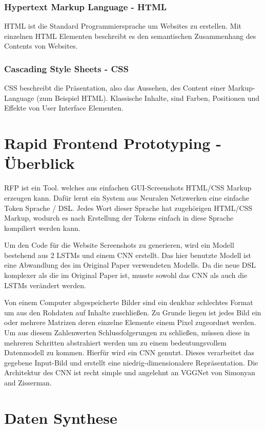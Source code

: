 \documentclass[pdftex,a4paper,halfparskip, article]{scrartcl}
\begin{document}
\subsubsection{Hypertext Markup Language - HTML}
HTML ist die Standard Programmiersprache um Websites zu erstellen. Mit einzelnen HTML Elementen beschreibt es den semantischen Zusammenhang des Contents von Websites.

\subsubsection{Cascading Style Sheets - CSS}
CSS beschreibt die Präsentation, also das Aussehen, des Content einer Markup-Language (zum Beispiel HTML). Klassische Inhalte, sind Farben, Positionen und Effekte von User Interface Elementen.
 

\section{Rapid Frontend Prototyping - Überblick}

RFP ist ein Tool. welches aus einfachen GUI-Screenshots HTML/CSS Markup erzeugen kann. Dafür lernt ein System aus Neuralen Netzwerken eine einfache Token Sprache / DSL. Jedes Wort dieser Sprache hat zugehörigen HTML/CSS Markup, wodurch es nach Erstellung der Tokens einfach in diese Sprache kompiliert werden kann.

Um den Code für die Website Screenshots zu generieren, wird ein Modell bestehend aus 2 LSTMs und einem CNN erstellt. Das hier benutzte Modell ist eine Abwandlung des im Original Paper verwendeten Modells. Da die neue DSL komplexer als die im Original Paper\cite{Beltramelli17} ist, musste sowohl das CNN als auch die LSTMs verändert werden. 

Von einem Computer abgespeicherte Bilder sind ein denkbar schlechtes Format um aus den Rohdaten auf Inhalte zuschließen. Zu Grunde liegen ist jedes Bild ein oder mehrere Matrizen deren einzelne Elemente einem Pixel zugeordnet werden. Um aus diesem Zahlenwerten Schlussfolgerungen zu schließen, müssen diese in mehreren Schritten abstrahiert werden um zu einem bedeutungsvollem Datenmodell zu kommen. Hierfür wird ein CNN genutzt. Dieses verarbeitet das gegebene Input-Bild und erstellt eine niedrig-dimensionalere Repräsentation. Die Architektur des CNN ist recht simple und angelehnt an VGGNet von Simonyan and Zisserman. 

\section{Daten Synthese}
\end{document}
